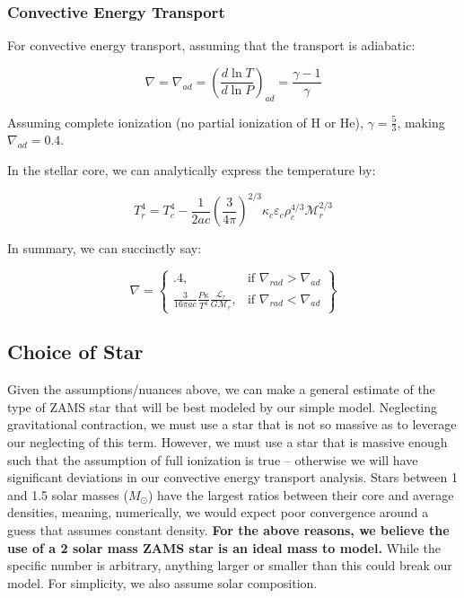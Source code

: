 \documentclass[twocolumn]{aastex631}
\begin{document}
\subsubsection{Convective Energy Transport}

For convective energy transport, assuming that the transport is adiabatic:

\begin{equation}
	\nabla = \nabla_{ad} = \left(\frac{d \ln{T}}{d \ln{P}}\right)_{ad} = \frac{\gamma - 1}{\gamma}
\end{equation}

Assuming complete ionization (no partial ionization of H or He), $\gamma = \frac{5}{3}$, making $ \nabla_{ad} = 0.4$.

In the stellar core, we can analytically express the temperature by:

\begin{equation}
	T_r^4 = T_c^4 - \frac{1}{2ac}\left(\frac{3}{4\pi}\right)^{2/3} \kappa_c \varepsilon_c \rho_c^{4/3} \mathcal{M}_r^{2/3}
\end{equation}

In summary, we can succinctly say:

\begin{equation}
\nabla = 
\left\{
    \begin{array}{rc}
        .4, & \text{if } \nabla_{rad} > \nabla_{ad}\\
        \frac{3}{16\pi ac}\frac{P \kappa}{T^4}\frac{\mathcal{L}_r}{G\mathcal{M}_r}, & \text{if } \nabla_{rad} < \nabla_{ad}
    \end{array}
\right\}
\end{equation}

\subsection{Choice of Star}

Given the assumptions/nuances above, we can make a general estimate of the type of ZAMS star that will be best modeled by our simple model. Neglecting gravitational contraction, we must use a star that is not so massive as to leverage our neglecting of this term. However, we must use a star that is massive enough such that the assumption of full ionization is true -- otherwise we will have significant deviations in our convective energy transport analysis. Stars between 1 and 1.5 solar masses ($M_\odot$) have the largest ratios between their core and average densities, meaning, numerically, we would expect poor convergence around a guess that assumes constant density. \textbf{For the above reasons, we believe the use of a 2 solar mass ZAMS star is an ideal mass to model.} While the specific number is arbitrary, anything larger or smaller than this could break our model. For simplicity, we also assume solar composition.
\end{document}
